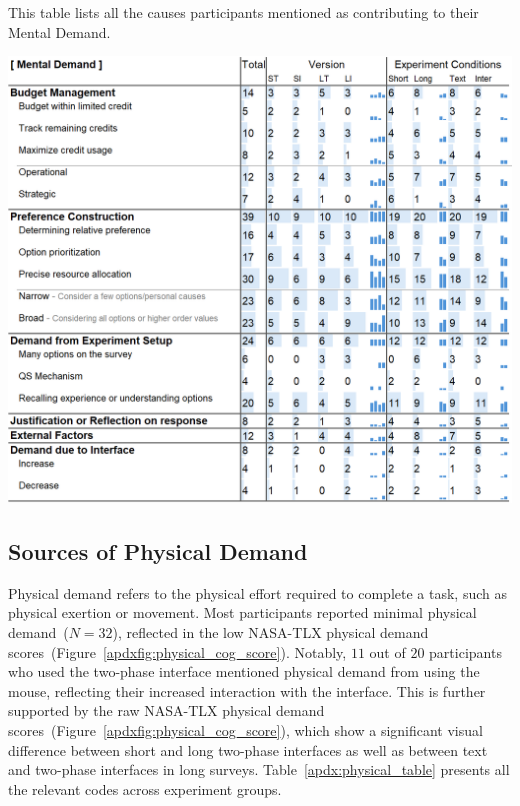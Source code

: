 \label{apdx:mental_table}
\begin{table}[ht!]
   \caption{This table lists all the causes participants mentioned as contributing to their Mental Demand.}
    \label{tbl:mental}
    \includegraphics[width=\linewidth]{content/image/cog/mental_table.png}
\end{table}

\subsection{Sources of Physical Demand} 
\label{apdx:physical}
Physical demand refers to the physical effort required to complete a task, such as physical exertion or movement. Most participants reported minimal physical demand~($N=32$), reflected in the low NASA-TLX physical demand scores~(Figure~\ref{apdxfig:physical_cog_score}). Notably, $11$ out of $20$ participants who used the two-phase interface mentioned physical demand from using the mouse, reflecting their increased interaction with the interface. This is further supported by the raw NASA-TLX physical demand scores~(Figure~\ref{apdxfig:physical_cog_score}), which show a significant visual difference between short and long two-phase interfaces as well as between text and two-phase interfaces in long surveys. Table~\ref{apdx:physical_table} presents all the relevant codes across experiment groups.


